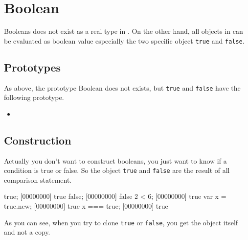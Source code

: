 \section{Boolean}

Booleans does not exist as a real type in \us. On the other hand, all
objects in \us can be evaluated as boolean value especially the two
specific object \lstinline|true| and \lstinline|false|.

\subsection{Prototypes}

As above, the prototype Boolean does not exists, but \lstinline|true|
and \lstinline|false| have the following prototype.

\begin{itemize}
\item {}
\end{itemize}

\subsection{Construction}

Actually you don't want to construct booleans, you just want to know
if a condition is true or false. So the object \lstinline|true| and
\lstinline|false| are the result of all comparison statement.

\begin{urbiscript}
true;
[00000000] true
false;
[00000000] false
2 < 6;
[00000000] true
var x = true.new;
[00000000] true
x === true;
[00000000] true
\end{urbiscript}

As you can see, when you try to clone \lstinline|true| or
\lstinline|false|, you get the object itself and not a copy.

